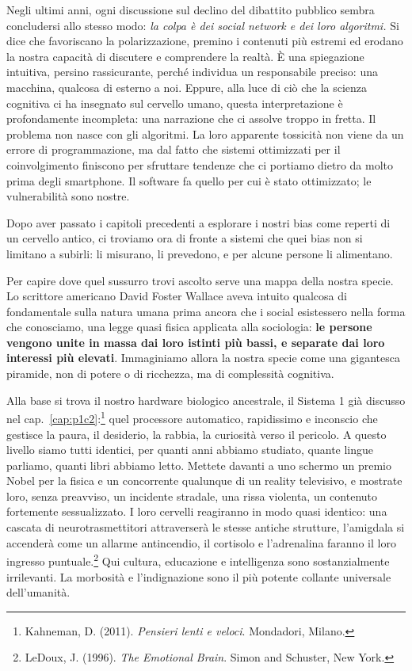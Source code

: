 Negli ultimi anni, ogni discussione sul declino del dibattito pubblico sembra concludersi allo stesso modo: \textit{la colpa è dei social network e dei loro algoritmi.} Si dice che favoriscano la polarizzazione, premino i contenuti più estremi ed erodano la nostra capacità di discutere e comprendere la realtà. È una spiegazione intuitiva, persino rassicurante, perché individua un responsabile preciso: una macchina, qualcosa di esterno a noi.
Eppure, alla luce di ciò che la scienza cognitiva ci ha insegnato sul cervello umano, questa interpretazione è profondamente incompleta: una narrazione che ci assolve troppo in fretta. Il problema non nasce con gli algoritmi. La loro apparente tossicità non viene da un errore di programmazione, ma dal fatto che sistemi ottimizzati per il coinvolgimento finiscono per sfruttare tendenze che ci portiamo dietro da molto prima degli smartphone. Il software fa quello per cui è stato ottimizzato; le vulnerabilità sono nostre.

Dopo aver passato i capitoli precedenti a esplorare i nostri bias come reperti di un cervello antico, ci troviamo ora di fronte a sistemi che quei bias non si limitano a subirli: li misurano, li prevedono, e per alcune persone li alimentano.

Per capire dove quel sussurro trovi ascolto serve una mappa della nostra specie. Lo scrittore americano David Foster Wallace aveva intuito qualcosa di fondamentale sulla natura umana prima ancora che i social esistessero nella forma che conosciamo, una legge quasi fisica applicata alla sociologia: \textbf{le persone vengono unite in massa dai loro istinti più bassi, e separate dai loro interessi più elevati}. Immaginiamo allora la nostra specie come una gigantesca piramide, non di potere o di ricchezza, ma di complessità cognitiva.

Alla base si trova il nostro hardware biologico ancestrale, il Sistema 1 già discusso nel cap.~\ref{cap:p1c2}:\footnote{Kahneman, D. (2011). \textit{Pensieri lenti e veloci}. Mondadori, Milano.} quel processore automatico, rapidissimo e inconscio che gestisce la paura, il desiderio, la rabbia, la curiosità verso il pericolo. A questo livello siamo tutti identici, per quanti anni abbiamo studiato, quante lingue parliamo, quanti libri abbiamo letto. Mettete davanti a uno schermo un premio Nobel per la fisica e un concorrente qualunque di un reality televisivo, e mostrate loro, senza preavviso, un incidente stradale, una rissa violenta, un contenuto fortemente sessualizzato. I loro cervelli reagiranno in modo quasi identico: una cascata di neurotrasmettitori attraverserà le stesse antiche strutture, l'amigdala si accenderà come un allarme antincendio, il cortisolo e l'adrenalina faranno il loro ingresso puntuale.\footnote{LeDoux, J. (1996). \textit{The Emotional Brain}. Simon and Schuster, New York.} Qui cultura, educazione e intelligenza sono sostanzialmente irrilevanti. La morbosità e l'indignazione sono il più potente collante universale dell'umanità.

